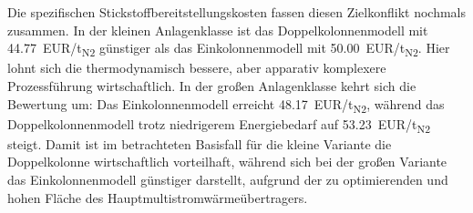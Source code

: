 Die spezifischen Stickstoffbereitstellungskosten fassen diesen Zielkonflikt nochmals zusammen. In der kleinen Anlagenklasse ist das Doppelkolonnenmodell mit \SI{44.77}{EUR/t_{N2}} günstiger als das Einkolonnenmodell mit \SI{50.00}{EUR/t_{N2}}. Hier lohnt sich die thermodynamisch bessere, aber apparativ komplexere Prozessführung wirtschaftlich. In der großen Anlagenklasse kehrt sich die Bewertung um: Das Einkolonnenmodell erreicht \SI{48.17}{EUR/t_{N2}}, während das Doppelkolonnenmodell trotz niedrigerem Energiebedarf auf \SI{53.23}{EUR/t_{N2}} steigt. Damit ist im betrachteten Basisfall für die kleine Variante die Doppelkolonne wirtschaftlich vorteilhaft, während sich bei der großen Variante das Einkolonnenmodell günstiger darstellt, aufgrund der zu optimierenden und hohen Fläche des Hauptmultistromwärmeübertragers.

